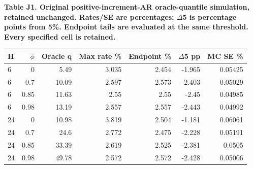 \documentclass[10pt,a4paper]{article}
\begin{document}
\begin{center}
\begin{minipage}{\linewidth}
\small\textbf{Table J1. Original positive-increment-AR oracle-quantile simulation, retained unchanged. Rates/SE are percentages; \(\Delta\)5 is percentage points from 5\%. Endpoint tails are evaluated at the same threshold. Every specified cell is retained.}\par\medskip
\centering\fontsize{8}{10}\selectfont
\begin{tabular}{lrrrrrr}
\toprule
H & \(\phi\) & Oracle q & Max rate \% & Endpoint \% & \(\Delta\)5 pp & MC SE \% \\
\midrule
6 & 0 & 5.49 & 3.035 & 2.454 & -1.965 & 0.05425 \\
6 & 0.7 & 10.09 & 2.597 & 2.573 & -2.403 & 0.05029 \\
6 & 0.85 & 11.63 & 2.55 & 2.55 & -2.45 & 0.04985 \\
6 & 0.98 & 13.19 & 2.557 & 2.557 & -2.443 & 0.04992 \\
24 & 0 & 10.98 & 3.819 & 2.504 & -1.181 & 0.06061 \\
24 & 0.7 & 24.6 & 2.772 & 2.475 & -2.228 & 0.05191 \\
24 & 0.85 & 33.39 & 2.619 & 2.525 & -2.381 & 0.0505 \\
24 & 0.98 & 49.78 & 2.572 & 2.572 & -2.428 & 0.05006 \\
\bottomrule
\end{tabular}
\end{minipage}
\end{center}
\end{document}
